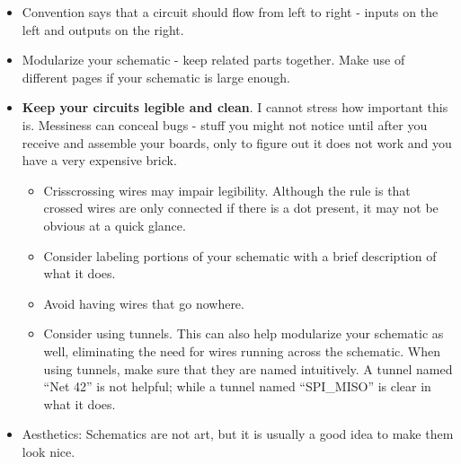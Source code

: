 \documentclass[letterpaper]{article}
\newcommand\liststyleRTFNumxiv{%
\renewcommand\labelitemi{{\textbullet}}
\renewcommand\labelitemii{o}
\renewcommand\labelitemiii{${\blacksquare}$}
\renewcommand\labelitemiv{{\textbullet}}
}
\begin{document}
\liststyleRTFNumxiv
\begin{itemize}
\item {\sffamily\color[rgb]{0.30980393,0.5058824,0.7411765}
Convention says that a circuit should {\textquotedbl}flow{\textquotedbl} from left to right - inputs on the left and
outputs on the right.}
\item {\sffamily\color[rgb]{0.30980393,0.5058824,0.7411765}
Modularize your schematic - keep related parts together. Make use of different pages if your schematic is large enough.}
\item {\sffamily\color[rgb]{0.30980393,0.5058824,0.7411765}
\textbf{Keep your circuits legible and clean}. I cannot stress how important this is. Messiness can conceal bugs - stuff
you might not notice until after you receive and assemble your boards, only to figure out it does not work and you have
a very expensive brick.}

\begin{itemize}
\item {\sffamily\color[rgb]{0.30980393,0.5058824,0.7411765}
Crisscrossing wires may impair legibility. Although the rule is that crossed wires are only connected if there is a dot
present, it may not be obvious at a quick glance.}
\item {\sffamily\color[rgb]{0.30980393,0.5058824,0.7411765}
Consider labeling portions of your schematic with a brief description of what it does. }
\item {\sffamily\color[rgb]{0.30980393,0.5058824,0.7411765}
Avoid having wires that go nowhere.}
\item {\sffamily\color[rgb]{0.30980393,0.5058824,0.7411765}
Consider using tunnels. This can also help modularize your schematic as well, eliminating the need for wires running
across the schematic. When using tunnels, make sure that they are named intuitively. A tunnel named ``Net 42'' is not
helpful; while a tunnel named ``SPI\_MISO'' is clear in what it does.}
\end{itemize}
\item {\sffamily\color[rgb]{0.30980393,0.5058824,0.7411765}
Aesthetics: Schematics are not art, but it is usually a good idea to make them look nice.}


\end{itemize}
\end{document}
